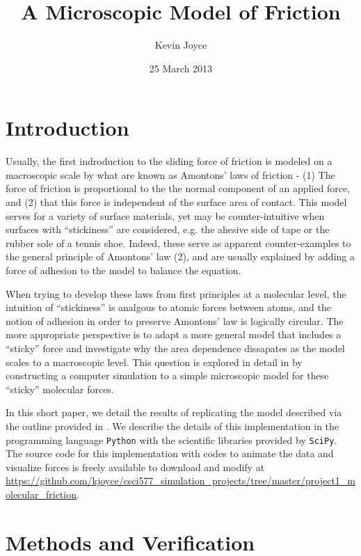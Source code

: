 \documentclass[12pt]{amsart}
\title{A Microscopic Model of Friction}
\author{Kevin Joyce}
\date{25 March 2013}
\begin{document}
\maketitle
\section{Introduction}

Usually, the first indroduction to the sliding force of friction is modeled on
a macroscopic scale by what are known as Amontons' laws of friction - (1) The
force of friction is proportional to the the normal component of an applied
force, and (2) that this force is independent of the surface area of
contact\cite{ringlein}.  This model serves for a variety of surface materials,
yet may be counter-intuitive when surfaces with ``stickiness'' are considered,
e.g. the ahesive side of tape or the rubber sole of a tennis shoe.  Indeed,
these serve as apparent counter-examples to the general principle of Amontons'
law (2), and are usually explained by adding a force of adhesion to the model
\cite{ringlein} to balance the equation.  

When trying to develop these laws from first principles at a molecular level,
the intuition of ``stickiness'' is analgous to atomic forces between atoms, and the
notion of adhesion in order to preserve Amontons' law is logically circular. 
The more appropriate perspective is to adapt a more general model that
includes a ``sticky'' force and investigate why the area dependence dissapates
as the model scales to a macroscopic level.  This question is explored in
detail in \cite{ringlein} by constructing a computer simulation to a simple
microscopic model for these ``sticky'' molecular forces.

In this short paper, we detail the results of replicating the model described
\cite{ringlein} via the outline provided in \cite{gould}.  We describe the
details of this implementation in the programming language \texttt{Python} with
the scientific libraries provided by \texttt{SciPy}.  The
source code for this implementation with codes to animate the data and
visualize forces is freely available to download and modify at
\url{https://github.com/kjoyce/csci577_simulation_projects/tree/master/project1_molecular_friction}.
   
\section{Methods and Verification} 
\end{document}
